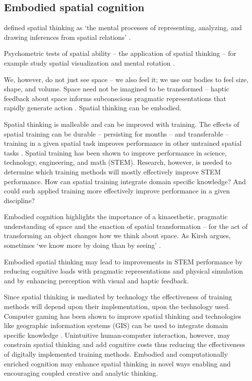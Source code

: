 \subsection{Embodied spatial cognition}



\citeauthor{Uttal2013} defined spatial thinking as 
`the mental processes of representing, analyzing, and drawing inferences from spatial relations' \citeyearpar{Uttal2013}. 


Psychometric tests of spatial ability -- the application of spatial thinking -- for example study spatial visualization and mental rotation \citep{Uttal2013,Uttal2013a,Ormand2014}.

We, however, do not just see space -- we also feel it; we use our bodies to feel size, shape, and volume. 
Space need not be imagined to be transformed -- haptic feedback about space informs subconscious pragmatic representations that rapidly generate action \citep{Jeannerod1997}. Spatial thinking can be embodied.

Spatial thinking is malleable and can be improved with training. 
The effects of spatial training can be durable -- persisting for months -- and transferable -- training in a given spatial task improves performance in other untrained spatial tasks \citep{Uttal2013}. 
Spatial training has been shown to improve performance in science, technology, engineering, and math (STEM). 
Research, however, is needed to determine which training methods will mostly effectively improve STEM performance. 
How can spatial training integrate domain specific knowledge? And could such applied training more effectively improve performance in a given discipline? \citep{Uttal2013} 


Embodied cognition highlights the importance of a kinaesthetic, pragmatic understanding of space
and the enaction of spatial transformation -- for the act of transforming an object changes how we think about space. 
As Kirsh argues, sometimes `we know more by doing than by seeing' \citeyearpar{Kirsh2013}.

Embodied spatial thinking may lead to improvements in STEM performance by reducing cognitive loads with pragmatic representations and physical simulation and by enhancing perception with visual and haptic feedback. 

Since spatial thinking is mediated by technology the effectiveness of training methods will depend upon their implementation, upon the technology used. 
Computer gaming has been shown to improve spatial thinking and technologies like geographic information systems (GIS) can be used to integrate domain specific knowledge \citep{Uttal2013}.
Unintuitive human-computer interaction, however, may constrain spatial thinking and add cognitive costs thus reducing the effectiveness of digitally implemented training methods. 
Embodied and computationally enriched cognition may enhance spatial thinking in novel ways
enabling and encouraging coupled creative and analytic thinking.




